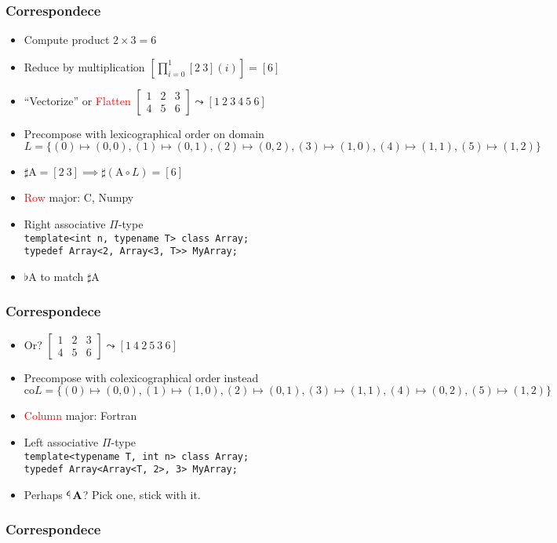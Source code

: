 \documentclass[xetex,mathserif,serif]{beamer}
\newcommand\mrm[1]{\mathrm{#1}}
\newcommand\brm[1]{\bm{\mrm{#1}}}
\newcommand\tlaf{\mathop{\rotatebox[origin=c]{180}{$\flat$}}}
\newcommand\NB[1]{\textcolor{red}{#1}}
\begin{document}
\begin{frame}
  \frametitle{Correspondece}
  \begin{itemize}[<+->]
    \item Compute product $2 \times 3 = 6$
    \item Reduce by multiplication $\left[\prod_{i=0}^1 [2\ 3](i)\right] = [ 6 ]$
    \item ``Vectorize'' or \NB{Flatten} $
      \begin{bmatrix}
        1 & 2 & 3 \\
        4 & 5 & 6
      \end{bmatrix} \leadsto [1\ 2\ 3\ 4\ 5\ 6]
      $
    \item Precompose with lexicographical order on domain $
      L = \{(0) \mapsto (0,0), (1)\mapsto (0,1), (2)\mapsto(0,2), (3)\mapsto(1,0), (4)\mapsto(1,1), (5)\mapsto(1,2)\}
      $
    \item $\sharp \brm A = [2\ 3] \implies \sharp (\brm A \circ L) = [6] $
    \item \NB{Row} major: C, Numpy
    \item Right associative $\Pi$-type\\
      \texttt{template<int n, typename T> class Array;} \\
      \texttt{typedef Array<2, Array<3, T>> MyArray;}
    \item $\flat \brm A$ to match $\sharp \brm A$
  \end{itemize}
\end{frame}

\begin{frame}
  \frametitle{Correspondece}
  \begin{itemize}[<+->]
    \item Or? $
      \begin{bmatrix}
        1 & 2 & 3 \\
        4 & 5 & 6
      \end{bmatrix} \leadsto [1\ 4\ 2\ 5\ 3\ 6]
      $ 
    \item Precompose with colexicographical order instead
      $\mrm{co}L = \{ (0)\mapsto(0,0), (1)\mapsto(1,0), (2)\mapsto(0,1), (3)\mapsto(1,1), (4)\mapsto(0,2), (5)\mapsto(1,2) \}$
    \item \NB{Column} major: Fortran
    \item Left associative $\Pi$-type \\
      \texttt{template<typename T, int n> class Array;} \\
      \texttt{typedef Array<Array<T, 2>, 3> MyArray;}
    \item Perhaps $\tlaf \brm A$? Pick one, stick with it.
  \end{itemize}
\end{frame}

\begin{frame}
  \frametitle{Correspondece}
\end{frame}
\end{document}
